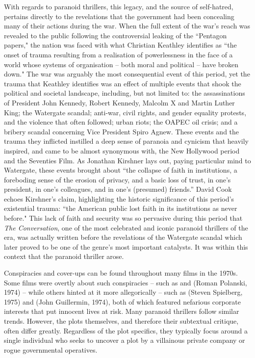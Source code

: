 With regards to paranoid thrillers, this legacy, and the source of self-hatred, pertains directly to the revelations that the government had been concealing many of their actions during the war.
When the full extent of the war's reach was revealed to the public following the controversial leaking of the ``Pentagon papers," the nation was faced with what Christian Keathley identifies as ``the onset of trauma resulting from a realisation of powerlessness in the face of a world whose systems of organisation – both moral and political – have broken down."\autocites[][293]{keathley_trapped_2004}
The war was arguably the most consequential event of this period, yet the trauma that Keathley identifies was an effect of multiple events that shook the political and societal landscape, including, but not limited to:
the assassinations of President John Kennedy, Robert Kennedy, Malcolm X and Martin Luther King;
the Watergate scandal;
anti-war, civil rights, and gender equality protests, and the violence that often followed;
urban riots;
the OAPEC oil crisis;
and a bribery scandal concerning Vice President Spiro Agnew.
These events and the trauma they inflicted instilled a deep sense of paranoia and cynicism that heavily inspired, and came to be almost synonymous with, the New Hollywood period and the Seventies Film.
As Jonathan Kirshner lays out, paying particular mind to Watergate, these events brought about ``the collapse of faith in institutions, a foreboding sense of the erosion of privacy, and a basic loss of trust, in one's president, in one's colleagues, and in one's (presumed) friends.”\autocites[][135]{kirshner_hollywoods_2012}
David Cook echoes Kirshner's claim, highlighting the historic significance of this period's existential trauma: ``the American public lost faith in its institutions as never before."\autocites[][116]{cook_1974_2007}
This lack of faith and security was so pervasive during this period that \textit{The Conversation}, one of the most celebrated and iconic paranoid thrillers of the era, was actually written before the revelations of the Watergate scandal which later proved to be one of the genre's most important catalysts.
It was within this context that the paranoid thriller arose.

Conspiracies and cover-ups can be found throughout many films in the 1970s. 
Some films were overtly about such conspiracies – such as  and  (Roman Polanski, 1974) – while others hinted at it more allegorically – such as  (Steven Spielberg, 1975) and  (John Guillermin, 1974), both of which featured nefarious corporate interests that put innocent lives at risk.
Many paranoid thrillers follow similar trends.
However, the plots themselves, and therefore their subtextual critique, often differ greatly.
Regardless of the plot specifics, they typically focus around a single individual who seeks to uncover a plot by a villainous private company or rogue governmental operatives.

